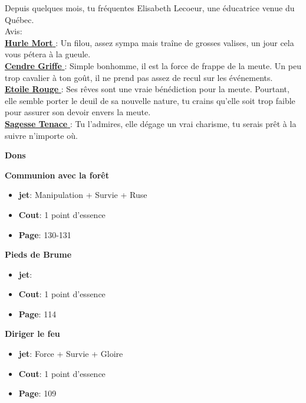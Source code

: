 \documentclass[oneside,12pt]{book}
\newcommand\don[5]{
\textbf{#1} \\
#2
\begin{itemize}
\item{ \textbf{jet}: #3}
\item{ \textbf{Cout}: #4}
\item{ \textbf{Page}: #5}
\end{itemize}
\vspace{0.5cm}
}
\newcommand{\Lynn}{\textbf{Etoile Rouge} }
\newcommand{\Jessica}{\textbf{Sagesse Tenace} }
\newcommand{\Luke}{\textbf{Cendre Griffe} }
\newcommand{\Peter}{\textbf{Hurle Mort} }
\begin{document}
\begin{flushleft}
\begin{description}
{Depuis quelques mois, tu fréquentes Elisabeth Lecoeur, une éducatrice venue du Québec.\\ 
Avis:\\
\underline{\Peter} : Un filou, assez sympa mais traîne de grosses valises, un jour cela vous pétera à la gueule.\\
\underline{\Luke} : Simple bonhomme, il est la force de frappe de la meute. Un peu trop cavalier à ton goût, il ne prend pas assez de recul sur les événements.\\
\underline{\Lynn}  : Ses rêves sont une vraie bénédiction pour la meute. Pourtant, elle semble porter le deuil de sa nouvelle nature, tu crains qu'elle soit trop faible pour assurer son devoir envers la meute.\\
\underline{\Jessica}: Tu l'admires, elle dégage un vrai charisme, tu serais prêt à la suivre n'importe où.\\
}
\end{description}
\clearpage
\textbf{\large Dons} 
\vspace{0.5cm}

\don{Communion avec la forêt}{}{Manipulation + Survie + Ruse}{1 point d'essence}{130-131}
\don{Pieds de Brume}{}{}{1 point d'essence}{114}
\don{Diriger le feu}{}{Force + Survie + Gloire}{1 point d'essence}{109}

\clearpage

\end{flushleft}
\end{document}
